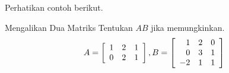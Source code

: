 Perhatikan contoh berikut.

\begin{example}{Mengalikan Dua Matriks}\label{exa:multiplicationoftwomatrices}
Tentukan $AB$ jika memungkinkan.
\begin{equation*}
A = \left[
\begin{array}{rrr}
1 & 2 & 1 \\
0 & 2 & 1
\end{array}
\right], B = \left[
\begin{array}{rrr}
1 & 2 & 0 \\
0 & 3 & 1 \\
-2 & 1 & 1
\end{array}
\right]
\end{equation*}
\end{example}

